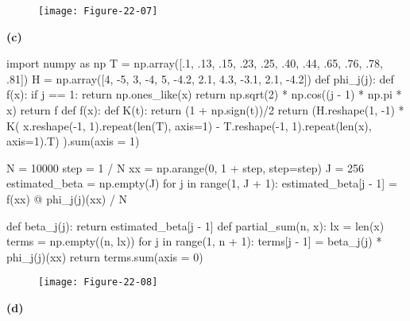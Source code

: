 \begin{figure}[H]
\centering
\texttt{[image: Figure-22-07]}
\end{figure}

\textbf{(c)}

\begin{python}
import numpy as np
T = np.array([.1, .13, .15, .23, .25, .40, .44, .65, .76, .78, .81])
H = np.array([4, -5, 3, -4, 5, -4.2, 2.1, 4.3, -3.1, 2.1, -4.2])
def phi_{j}(j):
    def f(x):
        if j == 1:
            return np.ones_like(x)
        return np.sqrt(2) * np.cos((j - 1) * np.pi * x)
    return f
def f(x):
    def K(t):
        return (1 + np.sign(t))/2
    return (H.reshape(1, -1) * K(
        x.reshape(-1, 1).repeat(len(T), axis=1) - T.reshape(-1, 1).repeat(len(x), axis=1).T)
    ).sum(axis = 1)
\end{python}

\begin{python}
N = 10000
step = 1 / N
xx = np.arange(0, 1 + step, step=step)
J = 256
estimated_beta = np.empty(J)
for j in range(1, J + 1):
    estimated_beta[j - 1] = f(xx) @ phi_{j}(j)(xx) / N
    
def beta_{j}(j):
    return estimated_beta[j - 1]
def partial_sum(n, x):
    lx = len(x)
    terms = np.empty((n, lx))
    for j in range(1, n + 1):
        terms[j - 1] = beta_{j}(j) * phi_{j}(j)(xx)
    return terms.sum(axis = 0)
\end{python}


\begin{figure}[H]
\centering
\texttt{[image: Figure-22-08]}
\end{figure}

\textbf{(d)}

